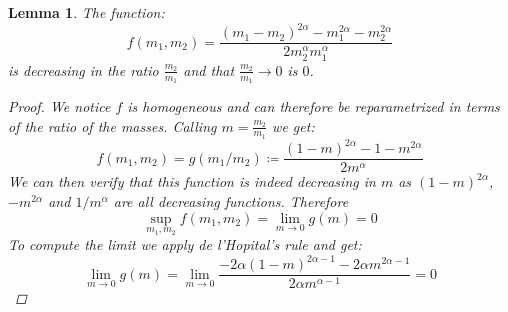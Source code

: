 \documentclass[11pt,reqno,a4paper]{amsart}
\numberwithin{equation}{section}
\theoremstyle{mytheorem}
\newtheorem{lemma}[subsection]{Lemma}
\theoremstyle{myremark}
\theoremstyle{myparagraph}
\begin{document}
    \begin{lemma}
        \label{lemma:difference_bound_decreasing}
        The function:
        \begin{equation}
            f(m_1, m_2) = \frac{(m_1 - m_2) ^ {2\alpha} - m_1^{2\alpha} - m_2^{2\alpha}}{2m_2^\alpha m_1^\alpha}
        \end{equation}
        is decreasing in the ratio $\frac{m_2}{m_1}$ and that $\frac{m_2}{m_1} \rightarrow 0$ is $0$.

        \begin{proof}
            We notice $f$ is homogeneous and can therefore be reparametrized in terms of the ratio of the masses. Calling $m= \frac{m_2}{m_1}$
            we get:
            \begin{equation}
                f(m_1, m_2) = g(m_1/m_2) \coloneqq \frac{(1 - m) ^ {2\alpha} - 1 - m^{2\alpha}}{2m^\alpha}
            \end{equation}
            We can then verify that this function is indeed decreasing in $m$ as $(1-m)^ {2\alpha}$, $-m^{2\alpha}$
            and $1/ m^\alpha$ are all decreasing functions.
            Therefore
            \begin{equation}
                \sup_{m_1, m_2} f(m_1,m_2) = \lim_{m \rightarrow 0} g(m) = 0
            \end{equation}
            To compute the limit we apply de l'Hopital's rule and get:
            \begin{equation}
                \lim_{m \rightarrow 0} g(m) = \lim_{m \rightarrow 0} \frac{-2\alpha (1-m)^{2\alpha-1} - 2\alpha m^{2\alpha-1}}{2\alpha m^{\alpha-1}} = 0
            \end{equation}
        \end{proof}

    \end{lemma}
\end{document}
